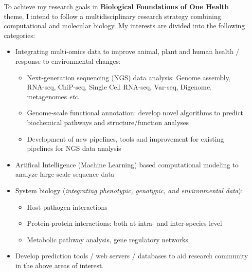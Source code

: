 
\hfill\par
To achieve my research goals in \textbf{Biological Foundations of One Health} theme, I intend to follow a multidisciplinary research strategy combining computational and molecular biology. 
My interests are divided into the following categories:
\begin{itemize}
\item Integrating multi-omics data to improve  animal, plant and human health / response to environmental changes:
\begin{itemize}
\item Next-generation sequencing (NGS) data analysis: Genome assembly, RNA-seq, ChiP-seq, Single Cell RNA-seq, Var-seq, Digenome, metagenomes \textit{etc}.
\item Genome-scale functional annotation: develop novel algorithms to predict biochemical pathways and structure/function analyses
\item Development of new pipelines, tools and improvement for existing pipelines for NGS data analysis
\end{itemize}
\item Artifical Intelligence (Machine Learning) based computational modeling to analyze large-scale sequence data
\item System biology (\textit{integrating phenotypic, genotypic, and environmental data}):
\begin{itemize}
\item Host-pathogen interactions
\item Protein-protein interactions: both at intra- and inter-species level
\item Metabolic pathway analysis, gene regulatory networks
\end{itemize}
\item Develop prediction tools / web servers / databases to aid research community in the above areas of interest.

\end{itemize}